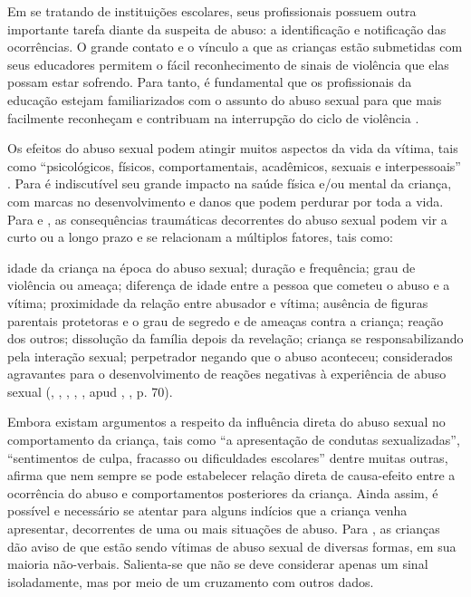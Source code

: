 Em se tratando de instituições escolares, seus profissionais possuem outra importante tarefa diante da suspeita de abuso: a identificação e notificação das ocorrências. O grande contato e o vínculo a que as crianças estão submetidas com seus educadores permitem o fácil reconhecimento de sinais de violência que elas possam estar sofrendo. Para tanto, é fundamental que os profissionais da educação estejam familiarizados com o assunto do abuso sexual para que mais facilmente reconheçam e contribuam na interrupção do ciclo de violência \cite{CHILDHOODBRASIL2009}.

Os efeitos do abuso sexual podem atingir muitos aspectos da vida da vítima, tais como ``psicológicos, físicos, comportamentais, acadêmicos, sexuais e interpessoais'' .  Para  é indiscutível seu grande impacto na saúde física e/ou mental da criança, com marcas no desenvolvimento e danos que podem perdurar por toda a vida. Para  e , as consequências traumáticas decorrentes do abuso sexual podem vir a curto ou a longo prazo e se relacionam a múltiplos fatores, tais como:

\begin{citacao}
	idade da criança na época do abuso sexual; duração e frequência; grau de violência ou ameaça; diferença de idade entre a pessoa que cometeu o abuso e a vítima; proximidade da relação entre abusador e vítima; ausência de figuras parentais protetoras e o grau de segredo e de ameaças contra a criança; reação dos outros; dissolução da família depois da revelação; criança se responsabilizando pela interação sexual; perpetrador negando que o abuso aconteceu; considerados agravantes para o desenvolvimento de reações negativas à experiência de abuso sexual (\citeauthor{FURNISS1993}, \citeyear{FURNISS1993}, \citeauthor{KAPLANSADOCKGREBB1997}, \citeyear{KAPLANSADOCKGREBB1997}, \citeauthor{SANDERSON2005}, \citeyear{SANDERSON2005} apud \citeauthor{HABIGZANG2012}, \citeyear{HABIGZANG2012}, p. 70).
\end{citacao}

Embora existam argumentos a respeito da influência direta do abuso sexual no comportamento da criança, tais como ``a apresentação de condutas sexualizadas'', ``sentimentos de culpa, fracasso ou dificuldades escolares'' dentre muitas outras,  afirma que nem sempre se pode estabelecer relação direta de causa-efeito entre a ocorrência do abuso e comportamentos posteriores da criança. Ainda assim, é possível e necessário se atentar para alguns indícios que a criança venha apresentar, decorrentes de uma ou mais situações de abuso. Para , as crianças dão aviso de que estão sendo vítimas de abuso sexual de diversas formas, em sua maioria não-verbais. Salienta-se que não se deve considerar apenas um sinal isoladamente, mas por meio de um cruzamento com outros dados.

